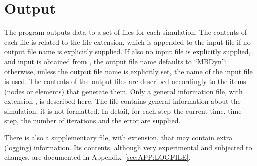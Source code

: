 \section{Output}
The program outputs data to a set of files for each simulation.
The contents of each file is related to the file extension,
which is appended to the input file if no output file name 
is explicitly supplied.
If also no input file is explicitly supplied, and input is obtained from 
, the output file name defaults to ``MBDyn''; otherwise, 
unless the output file name is explicitly set, the name 
of the input file is used.
The contents of the output files are described accordingly 
to the items (nodes or elements) that generate them.
Only a general information file, with extension , 
is described here. 
The file contains general information about the simulation; 
it is not formatted. 
In detail, for each step the current time, time step, the number of
iterations and the error are supplied.

There is also a supplementary file, with  extension,
that may contain extra (logging) information.
Its contents, although very experimental and subjected to changes,
are documented in Appendix~\ref{sec:APP:LOGFILE}.


